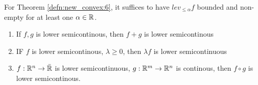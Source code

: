 \begin{remark}
  For Theorem \ref{defn:new_convex:6}, it suffices to have $lev_{\leq
    \alpha} f$ bounded and non-empty for at least one $\alpha \in \mathbb{R}$. 
\end{remark}

\begin{proposition}
  \begin{enumerate}
  \item If $f,g $ is lower semicontinous, then $f + g$ is lower semicontinous
  \item IF $f$ is lower semicontinous, $\lambda \geq 0$, then
    $\lambda f$ is lower semicontinuous
  \item $f: \mathbb{R}^{n} \rightarrow \bar {\mathbb{R}}$ is lower semicontinuous, $g:
    \mathbb{R}^{m} \rightarrow \mathbb{R}^{n}$ is continous, then $f \circ g$ is lower semicontinous.
  \end{enumerate}
\end{proposition}

